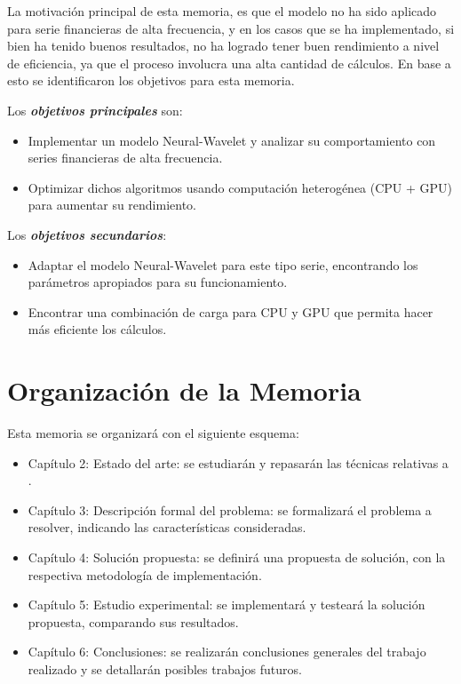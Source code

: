 La motivación principal de esta memoria, es que el modelo no ha sido aplicado
para serie financieras de alta frecuencia, y en los casos que se ha
implementado, si bien ha tenido buenos resultados, no ha logrado tener buen
rendimiento a nivel de eficiencia, ya que el proceso involucra una alta
cantidad de cálculos. En base a esto se identificaron los objetivos para esta
memoria.

Los \emph{\textbf{objetivos principales}} son:
\begin{itemize}
	\item Implementar un modelo Neural-Wavelet y analizar su comportamiento con
series financieras de alta frecuencia.
	\item Optimizar dichos algoritmos usando computación heterogénea (CPU +
GPU) para aumentar su rendimiento.
\end{itemize} 

Los \emph{\textbf{objetivos secundarios}}:
\begin{itemize}
	\item Adaptar el modelo Neural-Wavelet para este tipo serie, encontrando
los parámetros apropiados para su funcionamiento.
	\item Encontrar una combinación de carga para CPU y GPU que permita hacer
más eficiente los cálculos.
\end{itemize}

\section{Organización de la Memoria}

Esta memoria se organizará con el siguiente esquema:
\begin{itemize}
	\item Capítulo 2: Estado del arte: se estudiarán y repasarán las técnicas
relativas a .
	\item Capítulo 3: Descripción formal del problema: se formalizará el
problema a resolver, indicando las características consideradas.
	\item Capítulo 4: Solución propuesta: se definirá una propuesta de
solución, con la respectiva metodología de implementación. 
	\item Capítulo 5: Estudio experimental: se implementará y testeará la
solución propuesta, comparando sus resultados.
	\item Capítulo 6: Conclusiones: se realizarán conclusiones generales del
trabajo realizado y se detallarán posibles trabajos futuros.
\end{itemize}
